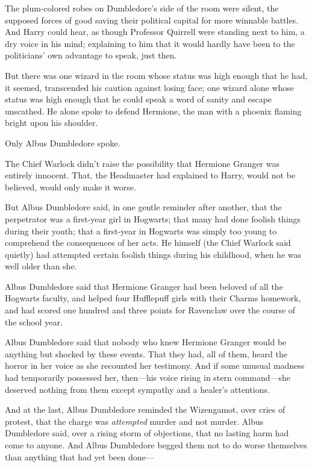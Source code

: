 The plum-colored robes on Dumbledore's side of the room were silent, the 
supposed forces of good saving their political capital for more winnable 
battles. And Harry could hear, as though Professor Quirrell were standing next 
to him, a dry voice in his mind; explaining to him that it would hardly have 
been to the politicians' own advantage to speak, just then.

But there was one wizard in the room whose status was high enough that he had, 
it seemed, transcended his caution against losing face; one wizard alone whose 
status was high enough that he could speak a word of sanity and escape 
unscathed. He alone spoke to defend Hermione, the man with a phoenix flaming 
bright upon his shoulder.

Only Albus Dumbledore spoke.

The Chief Warlock didn't raise the possibility that Hermione Granger was 
entirely innocent. That, the Headmaster had explained to Harry, would not be 
believed, would only make it worse.

But Albus Dumbledore said, in one gentle reminder after another, that the 
perpetrator was a first-year girl in Hogwarts; that many had done foolish 
things during their youth; that a first-year in Hogwarts was simply too young 
to comprehend the consequences of her acts. He himself (the Chief Warlock said 
quietly) had attempted certain foolish things during his childhood, when he was 
well older than she.

Albus Dumbledore said that Hermione Granger had been beloved of all the 
Hogwarts faculty, and helped four Hufflepuff girls with their Charms homework, 
and had scored one hundred and three points for Ravenclaw over the course of 
the school year.

Albus Dumbledore said that nobody who knew Hermione Granger would be anything 
but shocked by these events. That they had, all of them, heard the horror in 
her voice as she recounted her testimony. And if some unusual madness had 
temporarily possessed her, then---his voice rising in stern command---she 
deserved nothing from them except sympathy and a healer's attentions.

And at the last, Albus Dumbledore reminded the Wizengamot, over cries of 
protest, that the charge was \emph{attempted} murder and not murder. Albus 
Dumbledore said, over a rising storm of objections, that no lasting harm had 
come to anyone. And Albus Dumbledore begged them not to do worse themselves 
than anything that had yet been done---

